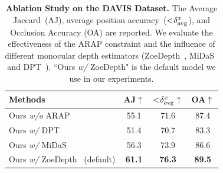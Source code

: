 \begin{table}[t]
\centering\small
\setlength{\tabcolsep}{8.5pt}
\begin{tabular}{lccc}
\toprule
  Methods & AJ$\uparrow$ & $<\hspace{-0.2em}\delta_{\text{avg}}^{x}$$\uparrow$ & OA$\uparrow$ \\
\midrule
Ours \textit{w/o} ARAP  & 55.1 & 71.6 & 87.4 \\
\midrule

Ours \textit{w/} DPT~\cite{ranftl2021vision} & 51.4 & 70.7 & 83.3 \\
Ours \textit{w/} MiDaS~\cite{birkl2023midas}  & 56.3  & 73.9 & 86.6  \\ 
Ours \textit{w/} ZoeDepth~\cite{ZoeDepth} (default) & \textbf{61.1} & \textbf{76.3} & \textbf{89.5}\\
\bottomrule
\end{tabular}
\vspace{-5pt}
\caption{\textbf{Ablation Study on the DAVIS
Dataset.} The Average Jaccard~(AJ), average position accuracy~($<\hspace{-0.2em}\delta_{\text{avg}}^{x}$), and Occlusion Accuracy (OA) are reported. We evaluate the effectiveness of the ARAP constraint and the influence of different monocular depth estimators (ZoeDepth~\cite{ZoeDepth}, MiDaS~\cite{birkl2023midas} and DPT~\cite{ranftl2021vision}). ``Ours \textit{w/} ZoeDepth" is the default model we use in our experiments.
}
\vspace{-4mm}
\label{table:ablatio_depth}
\end{table}
    
